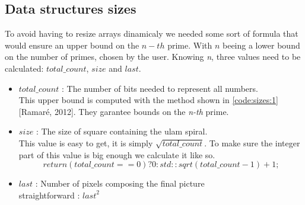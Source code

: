 \subsection{Data structures sizes}
To avoid having to resize arrays dinamicaly we needed some sort of formula that would ensure an upper bound on the $n-th$ prime. With $n$ beeing a lower bound on the number of primes, chosen by the user. Knowing \textit{n}, three values need to be calculated: $total\_count$, $size$ and $last$.
\begin{itemize}
	\item{$total\_count$} 
	: The number of bits needed to represent all numbers.\\ This upper bound is computed with the method shown in \ref{code:sizes:1} [Ramaré, 2012]. They garantee bounds on the \textit{n-th} prime.
	\item{$size$} 
	: The size of square containing the ulam spiral.\\
	This value is easy to get, it is simply $\sqrt{total\_count}$. To make sure the integer part of this value is big enough we calculate it like so.
	$$return (total\_count == 0) ? 0 : std::sqrt(total\_count - 1) + 1;$$

	\item{$last$}
	: Number of pixels composing the final picture\\
	straightforward : ${last}^{2}$
	
	
\end{itemize}


